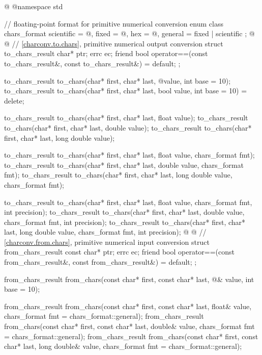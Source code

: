 %
\begin{codeblock}
@%
%
%
%
%
%
@namespace std {
  // floating-point format for primitive numerical conversion
  enum class chars_format {
    scientific = @\unspec@,
    fixed = @\unspec@,
    hex = @\unspec@,
    general = fixed | scientific
  };
@%
%
%
@
  // \ref{charconv.to.chars}, primitive numerical output conversion
  struct to_chars_result {
    char* ptr;
    errc ec;
    friend bool operator==(const to_chars_result&, const to_chars_result&) = default;
  };

  to_chars_result to_chars(char* first, char* last, @\seebelow@ value, int base = 10);
  to_chars_result to_chars(char* first, char* last, bool value, int base = 10) = delete;

  to_chars_result to_chars(char* first, char* last, float value);
  to_chars_result to_chars(char* first, char* last, double value);
  to_chars_result to_chars(char* first, char* last, long double value);

  to_chars_result to_chars(char* first, char* last, float value, chars_format fmt);
  to_chars_result to_chars(char* first, char* last, double value, chars_format fmt);
  to_chars_result to_chars(char* first, char* last, long double value, chars_format fmt);

  to_chars_result to_chars(char* first, char* last, float value,
                           chars_format fmt, int precision);
  to_chars_result to_chars(char* first, char* last, double value,
                           chars_format fmt, int precision);
  to_chars_result to_chars(char* first, char* last, long double value,
                           chars_format fmt, int precision);
@%
%
%
@
  // \ref{charconv.from.chars}, primitive numerical input conversion
  struct from_chars_result {
    const char* ptr;
    errc ec;
    friend bool operator==(const from_chars_result&, const from_chars_result&) = default;
  };

  from_chars_result from_chars(const char* first, const char* last,
                               @\seebelow@& value, int base = 10);

  from_chars_result from_chars(const char* first, const char* last, float& value,
                               chars_format fmt = chars_format::general);
  from_chars_result from_chars(const char* first, const char* last, double& value,
                               chars_format fmt = chars_format::general);
  from_chars_result from_chars(const char* first, const char* last, long double& value,
                               chars_format fmt = chars_format::general);
}
\end{codeblock}

